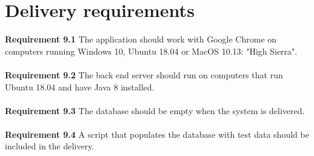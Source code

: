 \documentclass{article}
\begin{document}
\section{Delivery requirements}
\textbf{Requirement 9.1} The application should work with Google Chrome on computers running Windows 10, Ubuntu 18.04 or MacOS  10.13: "High Sierra".
\\ \\
\textbf{Requirement 9.2} The back end server should run on computers that run Ubuntu 18.04 and have Java 8 installed.
\\ \\ 
\textbf{Requirement 9.3} The database should be empty when the system is delivered.
\\ \\
\textbf{Requirement 9.4} A script that populates the database with test data should be included in the delivery.
\end{document}
